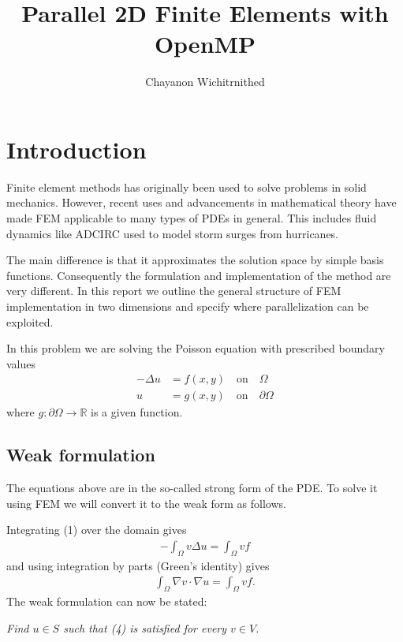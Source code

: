 \documentclass[12pt]{extreport}
\author{Chayanon Wichitrnithed}
\title{Parallel 2D Finite Elements with OpenMP}
\begin{document}
\maketitle
\section*{Introduction}
Finite element methods has originally been used to solve problems in solid mechanics. However, recent uses and advancements in mathematical theory have made FEM applicable to many types of PDEs in general. This includes fluid dynamics like ADCIRC used to model storm surges from hurricanes.

The main difference is that it approximates the solution space by simple basis functions. Consequently the formulation and implementation of the method are very different. In this report we outline the general structure of FEM implementation in two dimensions and specify where parallelization can be exploited.

In this problem we are solving the Poisson equation with prescribed boundary values
\begin{align}
  - \Delta u &= f(x,y) \quad \text{on} \quad \Omega \\
  u &= g(x,y) \quad \text{on} \quad \partial \Omega
\end{align}
where $g: \partial\Omega \rightarrow \mathbb{R}$ is a given function.

\subsection*{Weak formulation}
The equations above are in the so-called strong form of the PDE. To solve it using FEM we will convert it to the weak form as follows.

Integrating (1) over the domain gives
\begin{align}
  -\int_\Omega v \Delta u = \int_\Omega v f
\end{align}
and using integration by parts (Green's identity) gives
\begin{align}
  \int_\Omega \nabla v \cdot \nabla u = \int_\Omega v f.
\end{align}
The weak formulation can now be stated:

\textit{Find $u \in S$ such that (4) is satisfied for every $v \in V$.}
\end{document}
